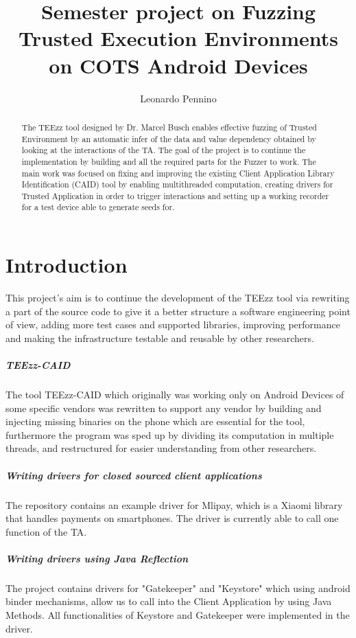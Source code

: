 \documentclass[a4paper,11pt,oneside]{report}
\title{Semester project on Fuzzing Trusted Execution Environments on COTS Android Devices}
\author{Leonardo Pennino}
\newcommand{\sysname}{TEEzz\xspace}
\begin{document}
\maketitle
\makeacks

\begin{abstract}
The \sysname tool designed by Dr. Marcel Busch enables effective fuzzing of
Trusted Environment by an automatic infer of the data and value dependency
obtained by looking at the interactions of the TA.
The goal of the project is to continue the implementation by building and all
the required parts for the Fuzzer to work. The main work was focused on fixing
and improving the existing Client Application Library Identification (CAID)
tool by enabling multithreaded computation, creating drivers for Trusted
Application in order to trigger interactions and setting up a working recorder
for a test device able to generate seeds for.
\end{abstract}

\maketoc

\chapter{Introduction}

This project's aim is to continue the development of the TEEzz tool via rewriting
a part of the source code to give it a better structure a software engineering
point of view, adding more test cases and supported libraries, improving performance and making the infrastructure testable
and reusable by other researchers.
\paragraph{TEEzz-CAID}
The tool TEEzz-CAID which originally was working only on Android Devices of
some specific vendors was rewritten to support any vendor by building and
injecting missing binaries on the phone which are essential for the tool,
furthermore the program was sped up by dividing its computation in multiple
threads, and restructured for easier understanding from other researchers.
\paragraph{Writing drivers for closed sourced client applications}
The repository contains an example driver for Mlipay, which is a Xiaomi library
that handles payments on smartphones. The driver is currently able to call one function
of the TA.
\paragraph{Writing drivers using Java Reflection}
The project contains drivers for "Gatekeeper" and "Keystore" which using android
binder mechanisms, allow us to call into the Client Application by using Java
Methods. All functionalities of Keystore and Gatekeeper were implemented in the driver.
\end{document}
